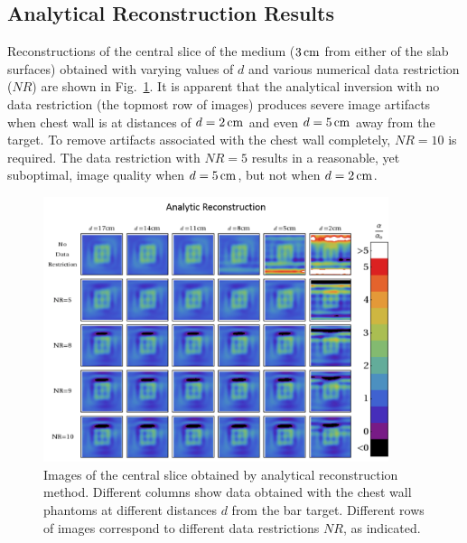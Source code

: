 \subsection{Analytical Reconstruction Results}
Reconstructions of the central slice of the medium ($3\,{\rm cm}$ from either of the slab surfaces) obtained with varying values of $d$ and various numerical data restriction ($NR$) are shown in Fig.~\ref{fig:fastcenter}. It is apparent that the analytical inversion with no data restriction (the topmost row of images) produces severe image artifacts when chest wall is at distances of $d=2\,{\rm cm}$ and even $d=5\,{\rm cm}$ away from the target. To remove artifacts associated with the chest wall completely, $NR=10$ is required. The data restriction with $NR=5$ results in a reasonable, yet suboptimal, image quality when $d=5\,{\rm cm}$, but not when $d=2\,{\rm cm}$. 
\begin{figure}[h]
\centering
\includegraphics[width=0.9\textwidth]{./figures/3_Chestwall/fastcenter.png}
\caption[Images of the central slice obtained by analytical reconstruction method]{\label{fig:fastcenter}
Images of the central slice obtained by analytical reconstruction method. Different columns show data obtained with the chest wall phantoms at different distances $d$ from the bar target. Different rows of images correspond to different data restrictions $NR$, as indicated.}
\end{figure}

